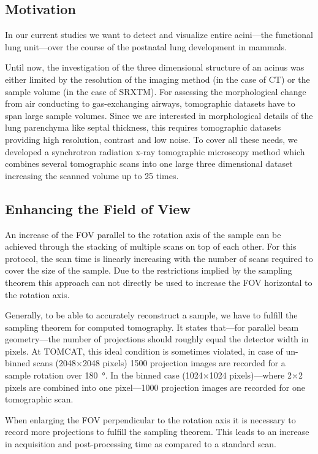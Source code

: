 \subsection{Motivation}%
In our current studies we want to detect and visualize entire acini---the functional lung unit---over the course of the postnatal lung development in mammals.

Until now, the investigation of the three dimensional structure of an acinus was either limited by the resolution of the imaging method (in the case of \micro CT) or the sample volume (in the case of SRXTM). For assessing the morphological change from air conducting to gas-exchanging airways, tomographic datasets have to span large sample volumes. Since we are interested in morphological details of the lung parenchyma like septal thickness, this requires tomographic datasets providing high resolution, contrast and low noise. To cover all these needs, we developed a synchrotron radiation x-ray tomographic microscopy method which combines several tomographic scans into one large three dimensional dataset increasing the scanned volume up to 25 times.

\subsection{Enhancing the Field of View}%
\label{subsec:enhancing the field of view}%
An increase of the FOV parallel to the rotation axis of the sample can be achieved through the stacking of multiple scans on top of each other. For this protocol, the scan time is linearly increasing with the number of scans required to cover the size of the sample. Due to the restrictions implied by the sampling theorem this approach can not directly be used to increase the FOV horizontal to the rotation axis.

Generally, to be able to accurately reconstruct a sample, we have to fulfill the sampling theorem for computed tomography. It states that---for parallel beam geometry---the number of projections should roughly equal the detector width in pixels. At TOMCAT, this ideal condition is sometimes violated, in case of un-binned scans (2048$\times$2048 pixels) 1500 projection images are recorded for a sample rotation over \SI{180}{\degree}. In the binned case (1024$\times$1024 pixels)---where 2$\times$2 pixels are combined into one pixel---1000 projection images are recorded for one tomographic scan.

When enlarging the FOV perpendicular to the rotation axis it is necessary to record more projections to fulfill the sampling theorem. This leads to an increase in acquisition and post-processing time as compared to a standard scan.